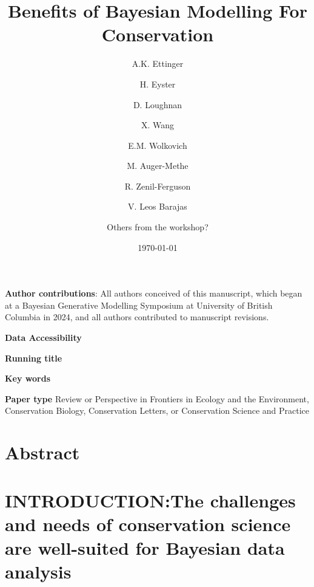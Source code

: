 \documentclass{article}
\begin{document}



\title{Benefits of Bayesian Modelling For Conservation} 
\author[1,a]{A.K. Ettinger}
\author[2]{H. Eyster}
\author[3]{D. Loughnan}
\author[3]{X. Wang}
\author[3]{E.M. Wolkovich}
\author[3]{M. Auger-Methe}
\author[4]{R. Zenil-Ferguson}
\author[5]{V. Leos Barajas}
\author[6]{Others from the workshop?}




\date{\today}
\maketitle 
\textbf{Author contributions}: All authors conceived of this manuscript, which began at a Bayesian Generative Modelling Symposium at University of British Columbia in 2024, and all authors contributed to manuscript revisions.

\textbf{Data Accessibility} 

\textbf{Running title} 

\textbf{Key words} 


\textbf{Paper type} Review or Perspective in Frontiers in Ecology and the Environment, Conservation Biology, Conservation Letters, or Conservation Science and Practice





\section*{Abstract} 


\newpage
\section* {INTRODUCTION:The challenges and needs of conservation science are well-suited for Bayesian data analysis}
\end{document}
